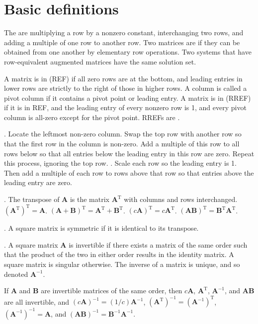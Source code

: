 \documentclass{slnotes}
\newcommand*{\TT}{\mathrm{T}}
\begin{document}
\chapter{Basic definitions}
The  are multiplying a row by a nonzero constant, interchanging two rows, and adding a multiple of one row to another row. Two matrices are  if they can be obtained from one another by elementary row operations. Two systems that have row-equivalent augmented matrices have the same solution set.

A matrix is in  (REF) if all zero rows are at the bottom, and leading entries in lower rows are strictly to the right of those in higher rows. A column is called a pivot column if it contains a pivot point or leading entry. A matrix is in  (RREF) if it is in REF, and the leading entry of every nonzero row is 1, and every pivot column is all-zero except for the pivot point. RREFs are .

. Locate the leftmost non-zero column. Swap the top row with another row so that the first row in the column is non-zero. Add a multiple of this row to all rows below so that all entries below the leading entry in this row are zero. Repeat this process, ignoring the top row. . Scale each row so the leading entry is 1. Then add a multiple of each row to rows above that row so that entries above the leading entry are zero.

. The transpose of \(\mathbf{A}\) is the matrix \(\mathbf{A}^{\TT}\) with columns and rows interchanged. \((\mathbf{A}^{\TT})^{\TT} = \mathbf{A}\). \((\mathbf{A} + \mathbf{B})^{\TT} = \mathbf{A}^{\TT} + \mathbf{B}^{\TT}\). \((c\mathbf{A})^{\TT} = c\mathbf{A}^{\TT}\). \((\mathbf{AB})^{\TT} = \mathbf{B}^{\TT}\mathbf{A}^{\TT}\).

. A square matrix is symmetric if it is identical to its transpose.

. A square matrix \(\mathbf{A}\) is invertible if there exists a matrix of the same order such that the product of the two in either order results in the identity matrix. A square matrix is singular otherwise. The inverse of a matrix is unique, and so denoted \(\mathbf{A}^{-1}\).

If \(\mathbf{A}\) and \(\mathbf{B}\) are invertible matrices of the same order, then \(c\mathbf{A}\), \(\mathbf{A}^{\TT}\), \(\mathbf{A}^{-1}\), and \(\mathbf{AB}\) are all invertible, and \((c\mathbf{A})^{-1} = (1/c)\mathbf{A}^{-1}\), \((\mathbf{A}^{\TT})^{-1} = (\mathbf{A}^{-1})^{\TT}\), \((\mathbf{A}^{-1})^{-1} = \mathbf{A}\), and \((\mathbf{AB})^{-1} = \mathbf{B}^{-1}\mathbf{A}^{-1}\).
\end{document}
